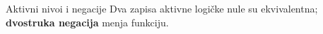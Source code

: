 \begin{frame}[label=03-s011]{Aktivni nivoi i negacije}
Dva zapisa aktivne logičke nule su ekvivalentna; \textcolor{DEisticanje}{\textbf{dvostruka negacija}} menja funkciju.
\par\vspace{1mm}
{\centering\par}
\par\vspace{1.5mm}
{\centering
{}
\vspace{1mm}
\par}
\end{frame}
